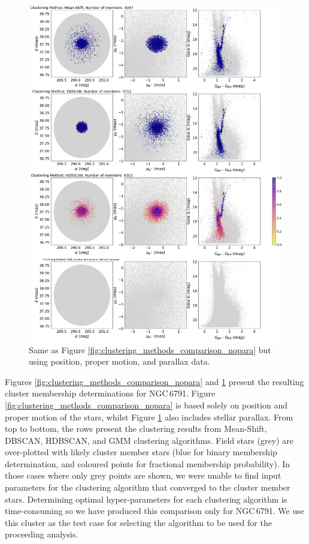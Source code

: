 \begin{figure}[hbtp]
    \centering
    \includegraphics[width=0.92\linewidth]{Chapter4/6791_cluster_comp_pospmpara.png}
    \caption[Clustering method comparison - NGC\,6791 (II)]{Same as Figure \ref{fig:clustering_methods_comparison_nopara} but using position, proper motion, and parallax data.}
    \label{fig:clustering_methods_comparison_para}
\end{figure}

Figures \ref{fig:clustering_methods_comparison_nopara} and \ref{fig:clustering_methods_comparison_para} present the resulting cluster membership determinations for NGC\,6791. Figure \ref{fig:clustering_methods_comparison_nopara} is based solely on position and proper motion of the stars, whilst Figure \ref{fig:clustering_methods_comparison_para} also includes stellar parallax. From top to bottom, the rows present the clustering results from Mean-Shift, DBSCAN, HDBSCAN, and GMM clustering algorithms. Field stars (grey) are over-plotted with likely cluster member stars (blue for binary membership determination, and coloured points for fractional membership probability). In those cases where only grey points are shown, we were unable to find input parameters for the clustering algorithm that converged to the cluster member stars. Determining optimal hyper-parameters for each clustering algorithm is time-consuming so we have produced this comparison only for NGC\,6791. We use this cluster as the test case for selecting the algorithm to be used for the proceeding analysis.


